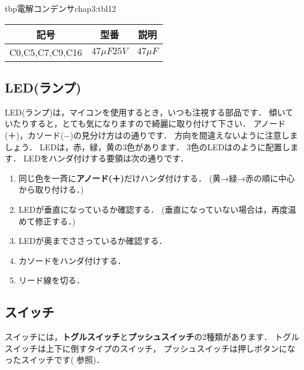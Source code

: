 \begin{mytable}{tbp}{電解コンデンサ}{chap3:tbl12}
{\small\begin{tabular}{l|l|l}
\hline
\hline
\multicolumn{1}{c|}{記号} &
\multicolumn{1}{c|}{型番} &
\multicolumn{1}{c}{説明} \\
\hline
C0,C5,C7,C9,C16 & $ 47 \mu F  25V $ & $ 47 \mu F$ \\
\end{tabular}}
\end{mytable}


\subsection{LED(ランプ)}
LED(ランプ)は，マイコンを使用するとき，いつも注視する部品です．
傾いていたりすると，とても気になりますので綺麗に取り付けて下さい．
アノード(＋)，カソード(−)の見分け方はの通りです．
方向を間違えないように注意しましょう．
LEDは，赤，緑，黄の3色があります．
3色のLEDはのように配置します．
LEDをハンダ付けする要領は次の通りです．

\begin{enumerate}
\item 同じ色を一斉に{\bf アノード(＋)}だけハンダ付けする．
(黄→緑→赤の順に中心から取り付ける．)
\item LEDが垂直になっているか確認する．
(垂直になっていない場合は，再度温めて修正する．)
\item LEDが奥までささっているか確認する．
\item カソードをハンダ付けする．
\item リード線を切る．
\end{enumerate}


\subsection{スイッチ}


スイッチには，{\bf トグルスイッチ}と{\bf プッシュスイッチ}の2種類があります．
トグルスイッチは上下に倒すタイプのスイッチ，
プッシュスイッチは押しボタンになったスイッチです( 参照)．

